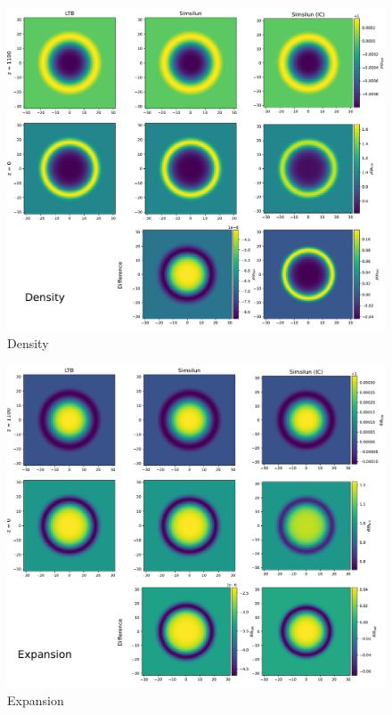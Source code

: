 \begin{figure}
    \centering
    \includegraphics[width=\textwidth]{../plots/Density.pdf}
    \caption{Density}
    \label{fig:density}
\end{figure}



\begin{figure}
    \centering
    \includegraphics[width=\textwidth]{../plots/Expansion.pdf}
    \caption{Expansion}
    \label{fig:expansion}
\end{figure}



